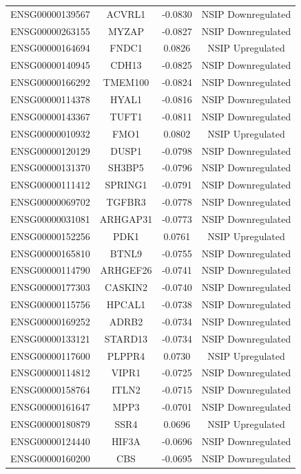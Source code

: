 \documentclass[
]{article}
\begin{document}
\begin{singlespace}
\begin{longtable}[t]{lccc}
ENSG00000139567 & ACVRL1 & -0.0830 & NSIP Downregulated\\
ENSG00000263155 & MYZAP & -0.0827 & NSIP Downregulated\\
ENSG00000164694 & FNDC1 & 0.0826 & NSIP Upregulated\\
ENSG00000140945 & CDH13 & -0.0825 & NSIP Downregulated\\
ENSG00000166292 & TMEM100 & -0.0824 & NSIP Downregulated\\
\addlinespace
ENSG00000114378 & HYAL1 & -0.0816 & NSIP Downregulated\\
ENSG00000143367 & TUFT1 & -0.0811 & NSIP Downregulated\\
ENSG00000010932 & FMO1 & 0.0802 & NSIP Upregulated\\
ENSG00000120129 & DUSP1 & -0.0798 & NSIP Downregulated\\
ENSG00000131370 & SH3BP5 & -0.0796 & NSIP Downregulated\\
\addlinespace
ENSG00000111412 & SPRING1 & -0.0791 & NSIP Downregulated\\
ENSG00000069702 & TGFBR3 & -0.0778 & NSIP Downregulated\\
ENSG00000031081 & ARHGAP31 & -0.0773 & NSIP Downregulated\\
ENSG00000152256 & PDK1 & 0.0761 & NSIP Upregulated\\
ENSG00000165810 & BTNL9 & -0.0755 & NSIP Downregulated\\
\addlinespace
ENSG00000114790 & ARHGEF26 & -0.0741 & NSIP Downregulated\\
ENSG00000177303 & CASKIN2 & -0.0740 & NSIP Downregulated\\
ENSG00000115756 & HPCAL1 & -0.0738 & NSIP Downregulated\\
ENSG00000169252 & ADRB2 & -0.0734 & NSIP Downregulated\\
ENSG00000133121 & STARD13 & -0.0734 & NSIP Downregulated\\
\addlinespace
ENSG00000117600 & PLPPR4 & 0.0730 & NSIP Upregulated\\
ENSG00000114812 & VIPR1 & -0.0725 & NSIP Downregulated\\
ENSG00000158764 & ITLN2 & -0.0715 & NSIP Downregulated\\
ENSG00000161647 & MPP3 & -0.0701 & NSIP Downregulated\\
ENSG00000180879 & SSR4 & 0.0696 & NSIP Upregulated\\
\addlinespace
ENSG00000124440 & HIF3A & -0.0696 & NSIP Downregulated\\
ENSG00000160200 & CBS & -0.0695 & NSIP Downregulated\\

\end{longtable}
\end{singlespace}
\end{document}
